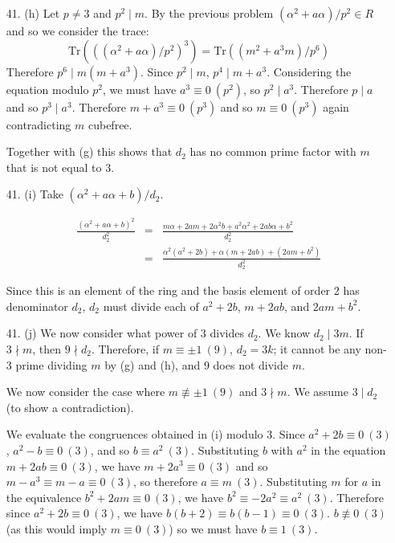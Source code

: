 \documentclass{article}
\newcommand{\trace}[1]{\text{Tr}(#1)}
\begin{document}
\begin{enumerate}
\item[41. (h)] Let $p \neq 3$ and $p^2 \mid m$.  By the previous problem $(\alpha^2 + a\alpha)/p^2 \in R$ and so we consider the trace:
\[ \trace{((\alpha^2 + a\alpha)/p^2)^3} = \trace{(m^2 + a^3 m)/p^6} \]
Therefore $p^6 \mid m(m + a^3)$.  Since $p^2 \mid m$, $p^4 \mid m + a^3$.  Considering the equation modulo $p^2$, we must have $a^3 \equiv 0\ (p^2)$, so $p^2 \mid a^3$.  Therefore $p \mid a$ and so $p^3 \mid a^3$.  Therefore $m + a^3 \equiv 0\ (p^3)$ and so $m \equiv 0\ (p^3)$ again contradicting $m$ cubefree.

Together with (g) this shows that $d_2$ has no common prime factor with $m$ that is not equal to 3.

\item[41. (i)] Take $(\alpha^2 + a\alpha + b)/d_2$.

\begin{eqnarray*}
    \frac{(\alpha^2 + a\alpha + b)^2}{d_2^2} &=& \frac{m\alpha + 2am + 2\alpha^2b + a^2\alpha^2 + 2ab\alpha + b^2}{d_2^2} \\
     &=& \frac{\alpha^2 (a^2 + 2b) + \alpha(m + 2ab) + (2am + b^2)}{d_2^2}
\end{eqnarray*}

Since this is an element of the ring and the basis element of order 2 has denominator $d_2$, $d_2$ must divide each of $a^2 + 2b$, $m + 2ab$, and $2am + b^2$.

\item[41. (j)]  We now consider what power of 3 divides $d_2$.  We know $d_2 \mid 3m$.  If $3 \nmid m$, then $9 \nmid d_2$.  Therefore, if $m \equiv \pm 1\ (9)$, $d_2 = 3k$; it cannot be any non-3 prime dividing $m$ by (g) and (h), and 9 does not divide $m$.

We now consider the case where $m \nequiv \pm 1\ (9)$ and $3 \nmid m$.  We assume $3 \mid d_2$ (to show a contradiction).

We evaluate the congruences obtained in (i) modulo 3.  Since $a^2 + 2b \equiv 0\ (3)$, $a^2 - b \equiv 0\ (3)$, and so $b \equiv a^2\ (3)$.  Substituting $b$ with $a^2$ in the equation $m + 2ab \equiv 0\ (3)$, we have $m + 2a^3 \equiv 0\ (3)$ and so $m - a^3 \equiv m - a \equiv 0\ (3)$, so therefore $a \equiv m\ (3)$.  Substituting $m$ for $a$ in the equivalence $b^2 + 2am \equiv 0\ (3)$, we have $b^2 \equiv -2a^2 \equiv a^2 \ (3)$.  Therefore since $a^2 + 2b \equiv 0\ (3)$, we have $b(b + 2) \equiv b(b - 1) \equiv 0\ (3)$.  $b \not\equiv 0\ (3)$ (as this would imply $m \equiv 0\ (3)$) so we must have $b \equiv 1\ (3)$.


\end{enumerate}
\end{document}

